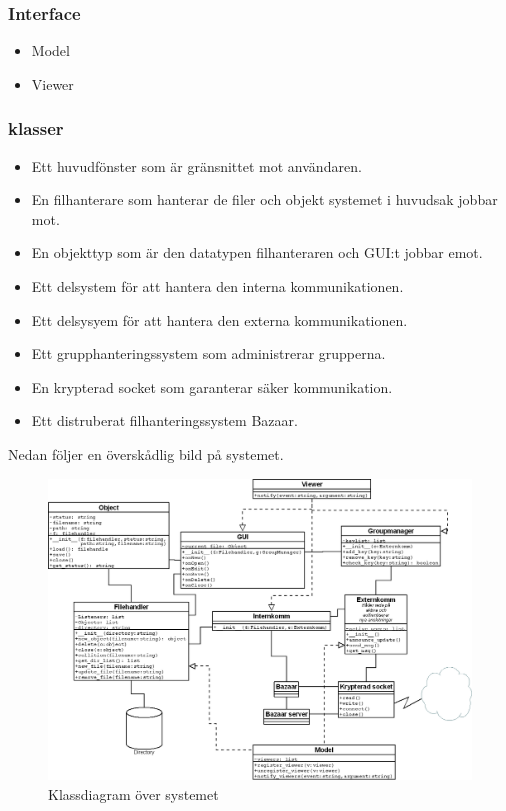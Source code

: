 \subsubsection{Interface}
\begin{itemize}
\item Model
\item Viewer
\end{itemize}
\subsubsection{klasser}
\begin{itemize}
\item Ett huvudfönster som är gränsnittet mot användaren.
\item En filhanterare som hanterar de filer och objekt systemet i huvudsak jobbar mot.
\item En objekttyp som är den datatypen filhanteraren och GUI:t jobbar emot.
\item Ett delsystem för att hantera den interna kommunikationen.
\item Ett delsysyem för att hantera den externa kommunikationen. 
\item Ett grupphanteringssystem som administrerar grupperna.
\item En krypterad socket som garanterar säker kommunikation.
\item Ett distruberat filhanteringssystem Bazaar.
\end{itemize}
Nedan följer en överskådlig bild på systemet.
 
\begin{figure}[ht]
  \centering
  \includegraphics[width=160mm]{klassdiagram.png}
  \caption{Klassdiagram över systemet}
  \label{fig1}
\end{figure}
\clearpage
